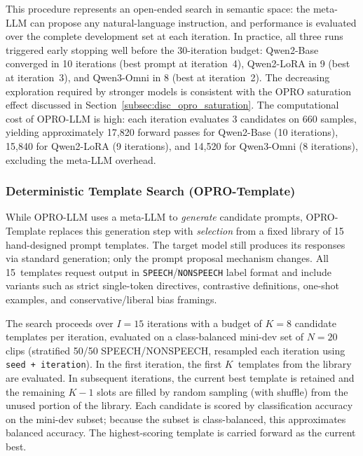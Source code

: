 \documentclass[11pt,a4paper]{article}
\begin{document}
This procedure represents an open-ended search in semantic space: the meta-LLM can propose any natural-language instruction, and performance is evaluated over the complete development set at each iteration. In practice, all three runs triggered early stopping well before the 30-iteration budget: Qwen2-Base converged in 10 iterations (best prompt at iteration~4), Qwen2-LoRA in 9 (best at iteration~3), and Qwen3-Omni in 8 (best at iteration~2). The decreasing exploration required by stronger models is consistent with the OPRO saturation effect discussed in Section~\ref{subsec:disc_opro_saturation}. The computational cost of OPRO-LLM is high: each iteration evaluates 3 candidates on 660 samples, yielding approximately 17{,}820 forward passes for Qwen2-Base (10 iterations), 15{,}840 for Qwen2-LoRA (9 iterations), and 14{,}520 for Qwen3-Omni (8 iterations), excluding the meta-LLM overhead.

\subsubsection{Deterministic Template Search (OPRO-Template)}
\label{subsubsec:opro_template}

While OPRO-LLM uses a meta-LLM to \textit{generate} candidate prompts, OPRO-Template replaces this generation step with \textit{selection} from a fixed library of 15 hand-designed prompt templates. The target model still produces its responses via standard generation; only the prompt proposal mechanism changes. All 15~templates request output in \texttt{SPEECH}/\texttt{NONSPEECH} label format and include variants such as strict single-token directives, contrastive definitions, one-shot examples, and conservative/liberal bias framings.

The search proceeds over $I = 15$ iterations with a budget of $K = 8$ candidate templates per iteration, evaluated on a class-balanced mini-dev set of $N = 20$ clips (stratified 50/50 SPEECH/NONSPEECH, resampled each iteration using \texttt{seed + iteration}). In the first iteration, the first $K$~templates from the library are evaluated. In subsequent iterations, the current best template is retained and the remaining $K - 1$ slots are filled by random sampling (with shuffle) from the unused portion of the library. Each candidate is scored by classification accuracy on the mini-dev subset; because the subset is class-balanced, this approximates balanced accuracy. The highest-scoring template is carried forward as the current best.
\end{document}
